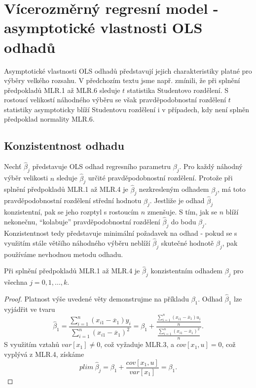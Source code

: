 \chapter[Vícerozměrný regresní model \\ Asymptotické vlastnosti OLS odhadů]{Vícerozměrný regresní model - asymptotické vlastnosti OLS odhadů}

Asymptotické vlastnosti OLS odhadů představují jejich charakteristiky platné pro výběry velkého rozsahu. V předchozím textu jsme např. zmínili, že 
při splnění předpokladů MLR.1 až MLR.6 sleduje $t$ statistika Studentovo rozdělení. S rostoucí velikostí náhodného výběru se však 
pravděpodobnostní rozdělení $t$ statistiky asymptoticky blíží Studentovu rozdělení i v případech, kdy není splněn předpoklad normality MLR.6.

\section{Konzistentnost odhadu}

Nechť $\hat{\beta}_j$ představuje OLS odhad regresního parametru $\beta_j$. Pro každý náhodný výběr velikosti $n$ sleduje $\hat{\beta}_j$ určité pravděpodobnostní rozdělení. Protože při splnění 
předpokladů MLR.1 až MLR.4 je $\hat{\beta}_j$ nezkresleným odhadem $\beta_j$, má toto pravděpodobnostní rozdělení střední hodnotu 
$\beta_j$. Jestliže je odhad $\hat{\beta}_j$ konzistentní, pak se jeho rozptyl s rostoucím $n$ zmenšuje. S tím, 
jak se $n$ blíží nekonečnu, ``kolabuje'' pravděpodobnostní rozdělení $\hat{\beta}_j$ do bodu $\beta_j$. Konzistentnost tedy představuje 
minimální požadavek na odhad - pokud se s využitím stále většího náhodného výběru neblíží $\hat{\beta}_j$ skutečné hodnotě 
$\beta_j$, pak používáme nevhodnou metodu odhadu.

\begin{theorem}
Při splnění předpokladů MLR.1 až MLR.4 je $\hat{\beta}_j$ konzistentním odhadem $\beta_j$ pro všechna $j = 0, 1, ..., k$.

\raggedleft{$\clubsuit$}
\end{theorem}

\begin{proof}
Platnost
 výše uvedené věty demonstrujme na příkladu $\beta_1$. Odhad $\hat{\beta}_1$ lze vyjádřit ve tvaru
\begin{equation}
\hat{\beta}_1 = \frac{\sum_{i=1}^n(x_{i1} - \overline{x}_1)y_i}{\sum_{i = 1}^n (x_{i1} - \overline{x}_1)^2} = \beta_1 + \frac{\frac{\sum_{i=1}^n(x_{i1} 
- \overline{x}_1)u_i}{n}}{\frac{\sum_{i = 1}^n (x_{i1} - \overline{x}_1)^2}{n}}.
\end{equation}
S využitím vztahů $var[x_1] \ne 0$, což vyžaduje MLR.3, a $cov[x_1, u] = 0$, což vyplývá z MLR.4, získáme
\begin{equation}
plim ~ \hat{\beta}_j = \beta_1 + \frac{cov[x_1, u]}{var[x_1]} = \beta_1.
\end{equation} 

\raggedleft{$\clubsuit$}
\end{proof}

